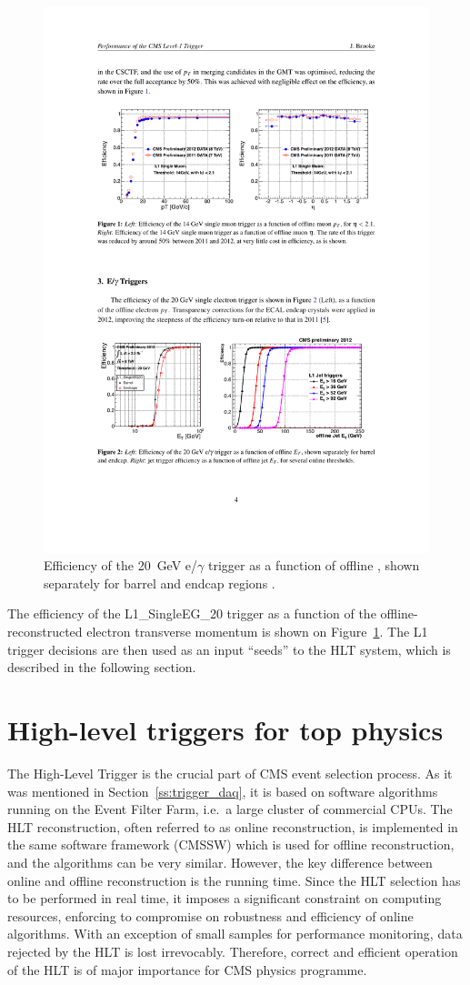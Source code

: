 \begin{figure}[!htbp]
  \begin{center}
    \leavevmode
    \includegraphics[width=0.5\columnwidth]{L1_turnon}
    \caption{Efficiency of the \SI{20}{\GeV} e/$\gamma$ trigger as a function of offline \ET, shown separately for
    barrel and endcap regions \cite{L1_Brooke}.}
    \label{fig:L1_seed_turn_on_curve}
  \end{center}
\end{figure}

The efficiency of the L1\_SingleEG\_20 trigger as a function of the offline-reconstructed electron transverse momentum
is shown on Figure~\ref{fig:L1_seed_turn_on_curve}. The L1 trigger decisions are then used as an input ``seeds'' to the
HLT system, which is described in the following section.

\section{High-level triggers for top physics}
\label{s:hlt_for_top_physics}
The High-Level Trigger \cite{HLT} is the crucial part of CMS event selection process. As it was mentioned in
Section~\ref{ss:trigger_daq}, it is based on software algorithms running on the Event Filter Farm, i.e.\ a large cluster
of commercial CPUs. The HLT reconstruction, often referred to as online reconstruction, is implemented in the same
software framework (CMSSW) which is used for offline reconstruction, and the algorithms can be very similar. However,
the key difference between online and offline reconstruction is the running time. Since the HLT selection has to be
performed in real time, it imposes a significant constraint on computing resources, enforcing to compromise on
robustness and efficiency of online algorithms. With an exception of small samples for performance monitoring, data
rejected by the HLT is lost irrevocably. Therefore, correct and efficient operation of the HLT is of major importance
for CMS physics programme.

